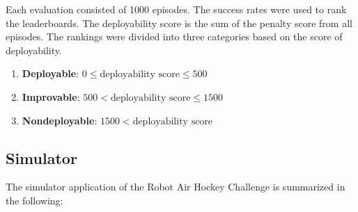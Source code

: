     Each evaluation consisted of 1000 episodes. The success rates were used to rank the leaderboards. The deployability score is the sum of the penalty score from all episodes. The rankings were divided into three categories based on the score of deployability.
    \begin{enumerate}
        \item \textbf{Deployable}: $0 \le \text{deployability score} \le 500$
        \item \textbf{Improvable}: $500 < \text{deployability score} \le 1500$
        \item \textbf{Nondeployable}: $1500 < \text{deployability score}$
    \end{enumerate}

\subsection{Simulator}
    The simulator application of the Robot Air Hockey Challenge is summarized in the following:
